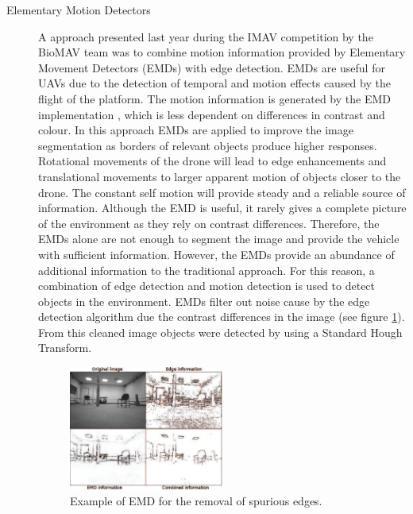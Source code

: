 \documentclass[a4paper]{article}
\begin{document}
\begin{description}
\item[Elementary Motion Detectors] A approach presented last year during the IMAV competition by the BioMAV team \cite{Gerke2011} was to combine motion information provided by Elementary Movement Detectors (EMDs) with edge detection. EMDs are useful for UAVs due to the detection of temporal and motion effects caused by the flight of the platform. The motion information is generated by the EMD implementation \cite{Zhang2008}, which is less dependent on differences in contrast and colour. In this approach EMDs are applied to improve the image segmentation as borders of relevant objects produce higher responses. Rotational movements of the drone will lead to edge enhancements and translational movements to larger apparent motion of objects closer to the drone. The constant self motion will provide steady and a reliable source of information. Although the EMD is useful, it rarely gives a complete picture of the environment as they rely on contrast differences. Therefore, the EMDs alone are not enough to segment the image and provide the vehicle with sufficient information. However, the EMDs provide an abundance of additional information to the traditional approach. For this reason, a combination of edge detection and motion detection is used to detect objects in the environment. EMDs filter out noise cause by the edge detection algorithm due the contrast differences in the image (see figure \ref{biomav}). From this cleaned image objects were detected by using a Standard Hough Transform.

\begin{figure}[!ht]
\centering
\includegraphics[width=0.5\textwidth]{images/gerke2011.png}
\caption{Example \cite{Gerke2011} of EMD for the removal of spurious edges.}
\label{biomav}
\end{figure}

\newpage


\end{description}
\end{document}
